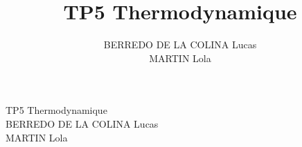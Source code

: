 \documentclass{beamer}
\title{TP5 Thermodynamique}
\author{BERREDO DE LA COLINA Lucas\\ MARTIN Lola}
\date{}
\begin{document}
\begin{frame}

\Huge{TP5 Thermodynamique}
\\[2em]
\large{BERREDO DE LA COLINA Lucas\\ MARTIN Lola}

\end{frame}
\end{document}

